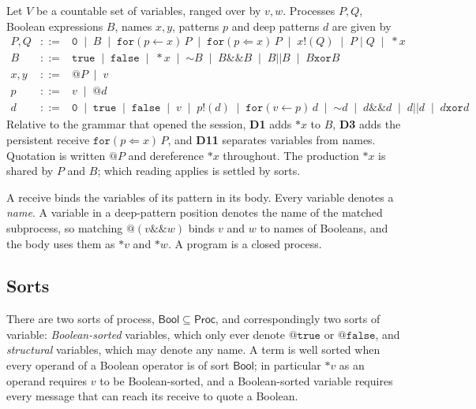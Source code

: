 \documentclass[10.5pt,a4paper]{extarticle}
\makeatletter
\newcommand{\kw}[1]{\texttt{#1}}
\newcommand{\nil}{\kw{0}}
\newcommand{\tru}{\kw{true}}
\newcommand{\fls}{\kw{false}}
\newcommand{\bnot}{\mathord{\sim}}
\newcommand{\band}{\mathbin{\&\&}}
\newcommand{\bor}{\mathbin{||}}
\newcommand{\bxor}{\mathbin{\kw{xor}}}
\newcommand{\quo}[1]{@#1}
\newcommand{\drp}[1]{{*}#1}
\newcommand{\for}[3]{\kw{for}(#1 \leftarrow #2)\,#3}
\newcommand{\forp}[3]{\kw{for}(#1 \Leftarrow #2)\,#3}
\newcommand{\snd}[2]{#1!(#2)}
\newcommand{\cpar}{\mathbin{|}}
\newcommand{\dec}[1]{\textbf{D#1}}
\theoremstyle{definition}
\theoremstyle{remark}
\makeatother
\begin{document}
Let $V$ be a countable set of variables, ranged over by $v,w$. Processes
$P,Q$, Boolean expressions $B$, names $x,y$, patterns $p$ and deep patterns
$d$ are given by
\[
\begin{array}{rcl}
P,Q &::=& \nil \;\mid\; B \;\mid\; \for{p}{x}{P} \;\mid\; \forp{p}{x}{P}
          \;\mid\; \snd{x}{Q} \;\mid\; P \cpar Q \;\mid\; \drp{x}\\[2pt]
B &::=& \tru \;\mid\; \fls \;\mid\; \drp{x} \;\mid\; \bnot B \;\mid\; B \band B
          \;\mid\; B \bor B \;\mid\; B \bxor B\\[2pt]
x,y &::=& \quo{P} \;\mid\; v\\[2pt]
p &::=& v \;\mid\; \quo{d}\\[2pt]
d &::=& \nil \;\mid\; \tru \;\mid\; \fls \;\mid\; v \;\mid\; \snd{p}{d}
          \;\mid\; \for{v}{p}{d}
          \;\mid\; \bnot d \;\mid\; d \band d \;\mid\; d \bor d \;\mid\; d \bxor d
\end{array}
\]
Relative to the grammar that opened the session, \dec{1} adds $\drp{x}$ to
$B$, \dec{3} adds the persistent receive $\forp{p}{x}{P}$, and \dec{11}
separates variables from names. Quotation is written $\quo{P}$ and
dereference $\drp{x}$ throughout. The production $\drp{x}$ is shared by $P$
and $B$; which reading applies is settled by sorts.

A receive binds the variables of its pattern in its body. Every variable
denotes a \emph{name}. A variable in a deep-pattern position denotes the name
of the matched subprocess, so matching $\quo{(v \band w)}$ binds $v$ and $w$
to names of Booleans, and the body uses them as $\drp{v}$ and $\drp{w}$.
A program is a closed process.

\subsection{Sorts}\label{sec:sorts}

There are two sorts of process, $\mathsf{Bool} \subseteq \mathsf{Proc}$, and
correspondingly two sorts of variable: \emph{Boolean-sorted} variables, which
only ever denote $\quo{\tru}$ or $\quo{\fls}$, and \emph{structural}
variables, which may denote any name. A term is well sorted when every
operand of a Boolean operator is of sort $\mathsf{Bool}$; in particular
$\drp{v}$ as an operand requires $v$ to be Boolean-sorted, and a
Boolean-sorted variable requires every message that can reach its receive to
quote a Boolean.
\end{document}
